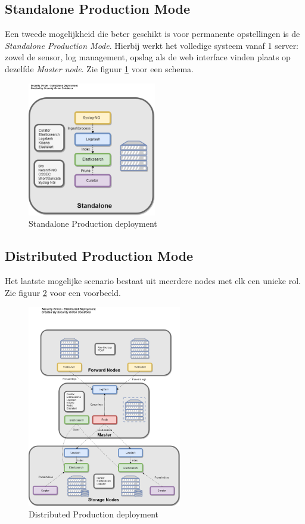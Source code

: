 \documentclass[a4paper,12pt]{report}
\begin{document}
\subsection{Standalone Production Mode}
Een tweede mogelijkheid die beter geschikt is voor permanente opstellingen is de \emph{Standalone Production Mode}.
Hierbij werkt het volledige systeem vanaf 1 server: zowel de sensor, log management, opslag als de web interface vinden plaats op dezelfde \emph{Master node}.
Zie figuur \ref{fig:so-architecture-standalone} voor een schema.
\\
\begin{figure}[h]
  \centering
  \includegraphics[width=0.5\textwidth]{so-architecture-production-standalone}
  \caption{Standalone Production deployment \autocite{so:docs}}
  \label{fig:so-architecture-standalone}
\end{figure}

\subsection{Distributed Production Mode}
Het laatste mogelijke scenario bestaat uit meerdere nodes met elk een unieke rol.
Zie figuur \ref{fig:so-architecture-distributed} voor een voorbeeld.
\\
\begin{figure}[h]
  \centering
  \includegraphics[width=0.6\textwidth]{so-architecture-production-distributed}
  \caption{Distributed Production deployment \autocite{so:docs}}
  \label{fig:so-architecture-distributed}
\end{figure}
\end{document}
